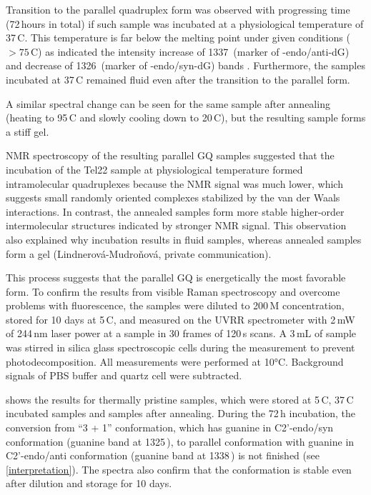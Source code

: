 Transition to the parallel quadruplex form was observed with progressing time
(72\,hours in total) if such sample was incubated at a physiological
temperature of 37\,\textdegree{}C.
This temperature is far below the melting point under given
conditions ($> 75$\,\textdegree{}C) as indicated the intensity increase of
1337\,\icm{} (marker of -endo/anti-dG) and decrease of
1326\,\icm{} (marker of -endo/syn-dG) bands
\parencite{%
	Nishimura1986b,%
	Benevides1988a,%
	Miura1994,%
	Miura1995,%
	Miura1995a,%
	Krafft2002%
}.
Furthermore, the samples incubated at 37\,\textdegree{}C remained fluid even
after the transition to the parallel form.

A similar spectral change can be seen for the same sample after annealing
(heating to 95\,\textdegree{}C and slowly cooling down to 20\,\textdegree{}C),
but the resulting sample forms a stiff gel.

NMR spectroscopy of the resulting parallel GQ samples suggested that the
incubation of the Tel22 sample at physiological temperature formed
intramolecular quadruplexes because the NMR signal was much lower, which
suggests
small randomly oriented complexes stabilized by the van der Waals interactions.
In contrast, the annealed samples form more stable higher-order intermolecular
structures indicated by stronger NMR signal.
This observation also explained why incubation results in fluid samples,
whereas annealed samples form a gel (Lindnerová-Mudroňová, private
communication).

This process suggests that the parallel GQ is energetically the most favorable
form.
To confirm the results from visible Raman spectroscopy and overcome problems
with fluorescence, the samples were diluted to 200\,M concentration,
stored for 10 days at 5\,\textdegree{}C, and measured on the UVRR spectrometer
with
2\,mW of 244\,nm laser power at a sample in 30 frames of 120\,s scans.
A 3\,mL of sample was stirred in silica glass spectroscopic cells during
the measurement to prevent photodecomposition.
All measurements were performed at 10°C.
Background signals of PBS buffer and quartz cell were subtracted.

 shows the results for thermally pristine samples,
which were stored at 5\,\textdegree{}C, 37\,\textdegree{}C incubated samples
and samples after annealing.
During the 72\,h incubation, the conversion from “3 + 1” conformation, which
has guanine in C2'-endo/syn conformation (guanine band at 1325\,\icm{}), to
parallel conformation with guanine in C2'-endo/anti conformation (guanine
band at 1338\,\icm{}) is not finished (see \cref{interpretation}).
The spectra also confirm that the conformation is stable even after dilution
and storage for 10 days.

